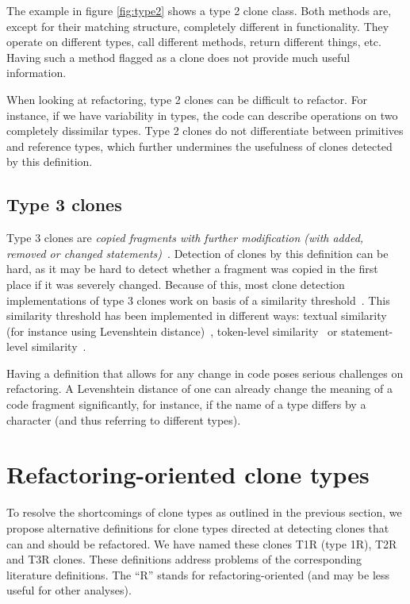 The example in figure \ref{fig:type2} shows a type 2 clone class. Both methods are, except for their matching structure, completely different in functionality. They operate on different types, call different methods, return different things, etc. Having such a method flagged as a clone does not provide much useful information.

When looking at refactoring, type 2 clones can be difficult to refactor. For instance, if we have variability in types, the code can describe operations on two completely dissimilar types. Type 2 clones do not differentiate between primitives and reference types, which further undermines the usefulness of clones detected by this definition.

\subsection{Type 3 clones}\label{sec:type3}
Type 3 clones are \textit{copied fragments with further modification (with added, removed or changed statements)}~\cite{roy2007survey}. Detection of clones by this definition can be hard, as it may be hard to detect whether a fragment was copied in the first place if it was severely changed. Because of this, most clone detection implementations of type 3 clones work on basis of a similarity threshold~\cite{roy2008nicad,ragkhitwetsagul2019siamese,jiang2007deckard,semura2017ccfindersw}. This similarity threshold has been implemented in different ways: textual similarity (for instance using Levenshtein distance)~\cite{lavoie2011automated}, token-level similarity~\cite{sajnani2016sourcerercc} or statement-level similarity~\cite{kamalpriya2017enhancing}.

Having a definition that allows for any change in code poses serious challenges on refactoring. A Levenshtein distance of one can already change the meaning of a code fragment significantly, for instance, if the name of a type differs by a character (and thus referring to different types).

\section{Refactoring-oriented clone types}
To resolve the shortcomings of clone types as outlined in the previous section, we propose alternative definitions for clone types directed at detecting clones that can and should be refactored. We have named these clones T1R (type 1R), T2R and T3R clones. These definitions address problems of the corresponding literature definitions. The ``R'' stands for refactoring-oriented (and may be less useful for other analyses).

